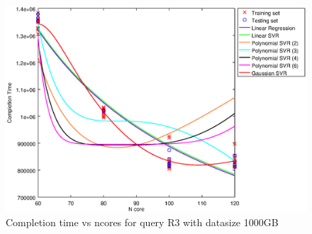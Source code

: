 
\begin {figure}[hbtp]
\centering
\includegraphics[width=\textwidth]{output/R3_1000_ONLY_1_OVER_NCORES/plot_R3_1000.eps}
\caption{Completion time vs ncores for query R3 with datasize 1000GB}
\label{fig:all_nonlinear_R3_1000}
\end {figure}
